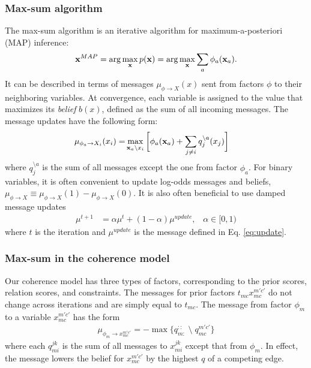 \subsubsection{Max-sum algorithm}
The max-sum algorithm is an iterative algorithm for maximum-a-posteriori (MAP) inference:
\begin{equation}
{\bf x}^{MAP} = \arg \max_{\bf x} p({\bf x}) = \arg \max_{\bf x} \sum_a \phi_a({\bf x}_a).
\end{equation}
 It can be described in terms of messages $\mu_{\phi \rightarrow X}(x)$ sent from factors $\phi$ to their neighboring variables. At convergence, each variable is assigned to the value that maximizes its \emph{belief} $b(x)$, defined as the sum of all incoming messages. The message updates have the following form:
\begin{align}
\mu_{\phi_a \rightarrow X_i}(x_i) =& \max_{ {\bf x}_a \setminus x_i } \bigg[ \phi_a({\bf x}_a) + \sum_{j \neq i} q_j^{\setminus a}(x_j)\bigg]
\label{eq:damping}
\end{align}
\noindent where $q_j^{\setminus a}$ is the sum of all messages except the one from factor $\phi_a$. For binary variables, it is often convenient to update log-odds messages and beliefs, $\mu_{\phi \rightarrow X} \equiv \mu_{\phi \rightarrow X}(1)-\mu_{\phi \rightarrow X}(0)$. It is also often beneficial to use damped message updates
\begin{align}
\mu^{t+1} &= \alpha \mu^t + (1 - \alpha) \mu^{update}, \;\;\; \alpha \in [0, 1)  
\end{align}
where $t$ is the iteration and $\mu^{update}$ is the message defined in Eq. \ref{eq:update}.


\subsubsection{Max-sum in the coherence model}

Our coherence model has three types of factors, corresponding to the prior scores, relation scores, and constraints. The messages for prior factors $t_{mc} x_{mc}^{m'c'}$ do not change across iterations and are simply equal to $t_{mc}$. The message from factor $\phi_m$ to a variable $x_{mc}^{m'c'}$ has the form
\begin{align}
\mu_{\phi_m \rightarrow x_{mc}^{m'c'}} = -\max \{ q_{m:}^{::} \; \setminus \; q_{mc}^{m'c'}\} 
\end{align}
where each $q_{mi}^{jk}$ is the sum of all messages to $x_{mi}^{jk}$ except that from $\phi_m$. In effect, the message lowers the belief for $x_{mc}^{m'c'}$ by the highest $q$ of a competing edge.


